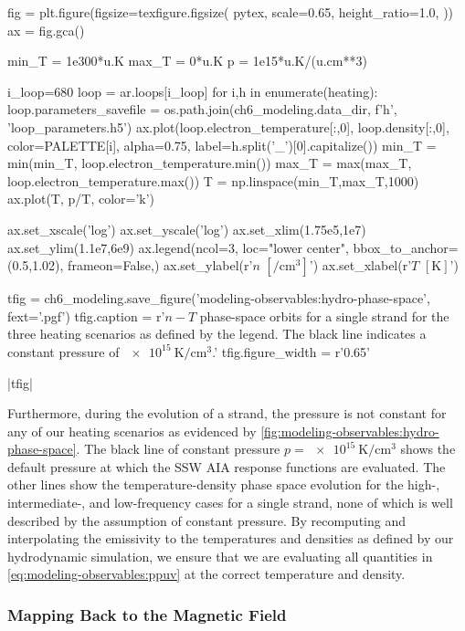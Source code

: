 \begin{pycode}
fig = plt.figure(figsize=texfigure.figsize(
    pytex,
    scale=0.65,
    height_ratio=1.0, 
))
ax = fig.gca()

min_T = 1e300*u.K
max_T = 0*u.K
p = 1e15*u.K/(u.cm**3)

i_loop=680
loop = ar.loops[i_loop]
for i,h in enumerate(heating):
    loop.parameters_savefile = os.path.join(ch6_modeling.data_dir, f'{h}', 'loop_parameters.h5')
    ax.plot(loop.electron_temperature[:,0], loop.density[:,0], color=PALETTE[i], alpha=0.75,
            label=h.split('_')[0].capitalize())
    min_T = min(min_T, loop.electron_temperature.min())
    max_T = max(max_T, loop.electron_temperature.max())
T = np.linspace(min_T,max_T,1000)
ax.plot(T, p/T, color='k')

ax.set_xscale('log')
ax.set_yscale('log')
ax.set_xlim(1.75e5,1e7)
ax.set_ylim(1.1e7,6e9)
ax.legend(ncol=3, loc="lower center", bbox_to_anchor=(0.5,1.02), frameon=False,)
ax.set_ylabel(r'$n$ $[\si{\per\cubic\cm}]$')
ax.set_xlabel(r'$T$ $[\si{\kelvin}]$')

tfig = ch6_modeling.save_figure('modeling-observables:hydro-phase-space', fext='.pgf')
tfig.caption = r'$n-T$ phase-space orbits for a single strand for the three heating scenarios as defined by the legend. The black line indicates a constant pressure of $\SI{e15}{\kelvin\per\cubic\cm}$.'
tfig.figure_width = r'0.65\textwidth'
\end{pycode}
|tfig|

Furthermore, during the evolution of a strand, the pressure is not constant for any of our heating scenarios as evidenced by \autoref{fig:modeling-observables:hydro-phase-space}. The black line of constant pressure $p=\SI{e15}{\kelvin\per\cubic\cm}$ shows the default pressure at which the SSW AIA response functions are evaluated. The other lines show the temperature-density phase space evolution for the high-, intermediate-, and low-frequency cases for a single strand, none of which is well described by the assumption of constant pressure. By recomputing and interpolating the emissivity to the temperatures and densities as defined by our hydrodynamic simulation, we ensure that we are evaluating all quantities in \autoref{eq:modeling-observables:ppuv} at the correct temperature and density.

\subsubsection{Mapping Back to the Magnetic Field}\label{sec:modeling-observables:mapping}

